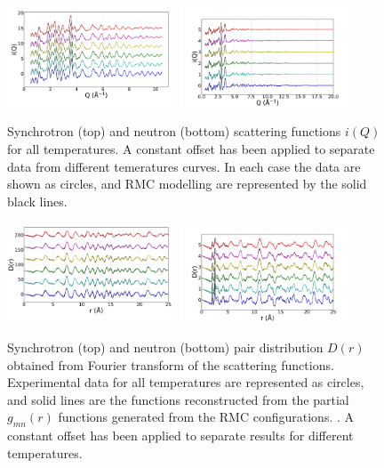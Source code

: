 \documentclass[twoside,twocolumn,9pt]{article}
\begin{document}
\begin{figure}[t]
\centering
\includegraphics[width=0.45\textwidth]{Pics/xsoq.pdf}
\includegraphics[width=0.45\textwidth]{Pics/nsoq.pdf}
\caption{Synchrotron (top) and neutron (bottom) scattering functions $i(Q)$ for all temperatures. A constant offset has been applied to separate data from different temeratures curves. In each case the data are shown as circles, and RMC modelling are represented by the solid black lines.}
\label{fig:iq}
\end{figure}

\begin{figure}[t]
\centering
\includegraphics[width=0.45\textwidth]{Pics/xpdf.pdf}
\includegraphics[width=0.45\textwidth]{Pics/npdf.pdf}
\caption{Synchrotron (top) and neutron (bottom) pair distribution $D(r)$ obtained from Fourier transform of the scattering functions. Experimental data for all temperatures are represented as circles, and solid lines are the functions reconstructed from the partial $g_{mn}(r)$ functions generated from the RMC configurations. . A constant offset has been applied to separate results for different temperatures.}
\label{fig:pdfs}
\end{figure}
\end{document}
